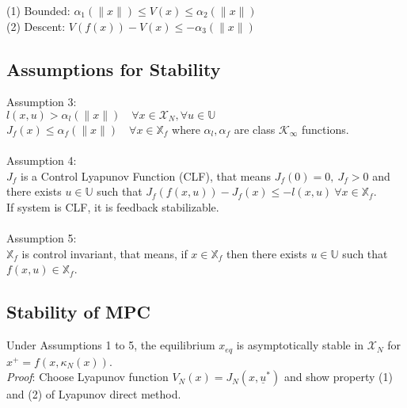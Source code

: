 \documentclass[english]{latex4ei/latex4ei_sheet}
\begin{document}
\begin{sectionbox}
\begin{emphbox}
    (1) Bounded: $\alpha_{1}(\|x\|) \leq V(x) \leq \alpha_{2}(\|x\|)$ \\ 
    (2) Descent: $V(f(x))-V(x) \leq-\alpha_{3}(\|x\|)$\\
\end{emphbox}

\subsection{Assumptions for Stability}
Assumption 3:\\
$l(x, u)>\alpha_{l}(\|x\|) \quad \forall x \in \mathcal{X}_{N}, \forall u \in \mathbb{U}$ \\ 
$J_{f}(x) \leq \alpha_{f}(\|x\|) \quad \forall x \in \mathbb{X}_{f}$ where $\alpha_{l}, \alpha_{f}$ are class $\mathcal{K}_{\infty}$ functions.\\
\\
Assumption 4:\\
$J_f$ is a Control Lyapunov Function (CLF), that means $J_f(0)=0,\ J_f>0$ and there exists $u\in\mathbb{U}$ such that $J_f(f(x,u))-J_f(x)\leq-l(x,u)\ \forall x\in\mathbb{X}_f$.\\
If system is CLF, it is feedback stabilizable.\\
\\
Assumption 5:\\
$\mathbb{X}_f$ is control invariant, that means, if $x\in\mathbb{X}_f$ then there exists $u\in\mathbb{U}$ such that $f(x,u)\in\mathbb{X}_f$.\\ 

\subsection{Stability of MPC}
Under Assumptions 1 to 5, the equilibrium $x_{eq}$ is asymptotically stable in $\mathcal{X}_N$ for $x^{+}=f(x,\kappa_{N}(x))$.\\
\textit{Proof}: Choose Lyapunov function $V_N(x)=J_N(x,\underline{u}^{*})$ and show property (1) and (2) of Lyapunov direct method.\\


\end{sectionbox}
\end{document}
